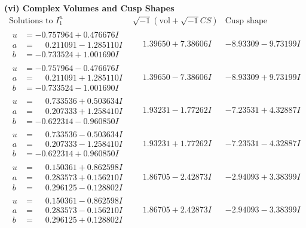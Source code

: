 \documentclass[1p]{elsarticle_modified}
\theoremstyle{definition}
\newcommand{\I}{\sqrt{-1}}
\begin{document}
\newpage\flushleft \textbf{(vi) Complex Volumes and Cusp Shapes}
$$\begin{array}{c|c|c}  
\text{Solutions to }I^u_{1}& \I (\text{vol} + \sqrt{-1}CS) & \text{Cusp shape}\\
 \hline 
\begin{aligned}
u &= -0.757964 + 0.476676 I \\
a &= \phantom{-}0.211091 - 1.285110 I \\
b &= -0.733524 + 1.001690 I\end{aligned}
 & \phantom{-}1.39650 + 7.38606 I & -8.93309 - 9.73199 I \\ \hline\begin{aligned}
u &= -0.757964 - 0.476676 I \\
a &= \phantom{-}0.211091 + 1.285110 I \\
b &= -0.733524 - 1.001690 I\end{aligned}
 & \phantom{-}1.39650 - 7.38606 I & -8.93309 + 9.73199 I \\ \hline\begin{aligned}
u &= \phantom{-}0.733536 + 0.503634 I \\
a &= \phantom{-}0.207333 + 1.258410 I \\
b &= -0.622314 - 0.960850 I\end{aligned}
 & \phantom{-}1.93231 - 1.77262 I & -7.23531 + 4.32887 I \\ \hline\begin{aligned}
u &= \phantom{-}0.733536 - 0.503634 I \\
a &= \phantom{-}0.207333 - 1.258410 I \\
b &= -0.622314 + 0.960850 I\end{aligned}
 & \phantom{-}1.93231 + 1.77262 I & -7.23531 - 4.32887 I \\ \hline\begin{aligned}
u &= \phantom{-}0.150361 + 0.862598 I \\
a &= \phantom{-}0.283573 + 0.156210 I \\
b &= \phantom{-}0.296125 - 0.128802 I\end{aligned}
 & \phantom{-}1.86705 - 2.42873 I & -2.94093 + 3.38399 I \\ \hline\begin{aligned}
u &= \phantom{-}0.150361 - 0.862598 I \\
a &= \phantom{-}0.283573 - 0.156210 I \\
b &= \phantom{-}0.296125 + 0.128802 I\end{aligned}
 & \phantom{-}1.86705 + 2.42873 I & -2.94093 - 3.38399 I \\ \hline\begin{aligned}

\end{aligned}
\end{array}$$
\end{document}
